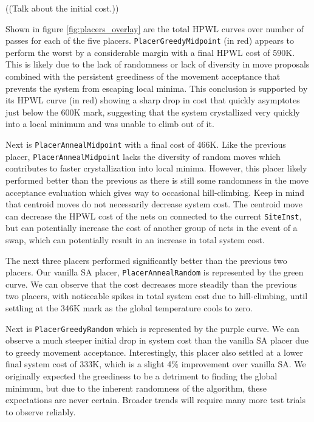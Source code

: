 ((Talk about the initial cost.))

Shown in figure \ref{fig:placers_overlay} are the total HPWL curves over number of passes for each of the five placers. 
\texttt{PlacerGreedyMidpoint} (in red) appears to perform the worst by a considerable margin with a final HPWL cost of 590K.
This is likely due to the lack of randomness or lack of diversity in move proposals combined with the persistent greediness of the movement acceptance that prevents the system from escaping local minima.
This conclusion is supported by its HPWL curve (in red) showing a sharp drop in cost that quickly asymptotes just below the 600K mark, suggesting that the system crystallized very quickly into a local minimum and was unable to climb out of it.

Next is \texttt{PlacerAnnealMidpoint} with a final cost of 466K.
Like the previous placer, \texttt{PlacerAnnealMidpoint} lacks the diversity of random moves which contributes to faster crystallization into local minima.
However, this placer likely performed better than the previous as there is still some randomness in the move acceptance evaluation which gives way to occasional hill-climbing. 
Keep in mind that centroid moves do not necessarily decrease system cost. 
The centroid move can decrease the HPWL cost of the nets on connected to the current \texttt{SiteInst}, but can potentially increase the cost of another group of nets in the event of a swap, which can potentially result in an increase in total system cost.

The next three placers performed significantly better than the previous two placers.
Our vanilla SA placer, \texttt{PlacerAnnealRandom} is represented by the green curve.
We can observe that the cost decreases more steadily than the previous two placers, with noticeable spikes in total system cost due to hill-climbing, until settling at the 346K mark as the global temperature cools to zero.

Next is \texttt{PlacerGreedyRandom} which is represented by the purple curve.
We can observe a much steeper initial drop in system cost than the vanilla SA placer due to greedy movement acceptance.
Interestingly, this placer also settled at a lower final system cost of 333K, which is a slight 4\% improvement over vanilla SA.
We originally expected the greediness to be a detriment to finding the global minimum, but due to the inherent randomness of the algorithm, these expectations are never certain.
Broader trends will require many more test trials to observe reliably.

